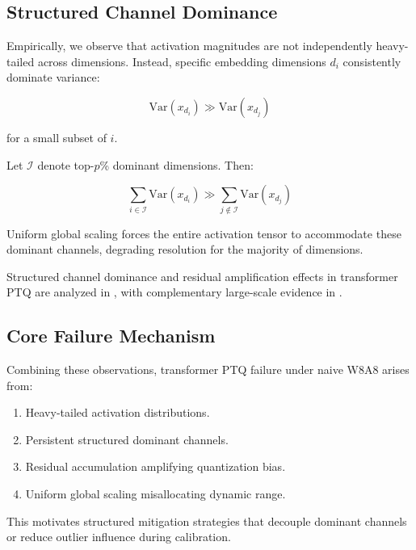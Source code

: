 \documentclass[conference]{IEEEtran}
\begin{document}
\subsection{Structured Channel Dominance}

Empirically, we observe that activation magnitudes are not independently heavy-tailed across dimensions. Instead, specific embedding dimensions $d_i$ consistently dominate variance:

\begin{equation}
\mathrm{Var}(x_{d_i}) \gg \mathrm{Var}(x_{d_j})
\end{equation}

for a small subset of $i$.

Let $\mathcal{I}$ denote top-$p$\% dominant dimensions. Then:

\begin{equation}
\sum_{i \in \mathcal{I}} \mathrm{Var}(x_{d_i}) \gg
\sum_{j \notin \mathcal{I}} \mathrm{Var}(x_{d_j})
\end{equation}

Uniform global scaling forces the entire activation tensor to accommodate these dominant channels, degrading resolution for the majority of dimensions.

Structured channel dominance and residual amplification effects in transformer PTQ are analyzed in \cite{bondarenko2021understanding}, with complementary large-scale evidence in \cite{dettmers2022llmint8}.

\subsection{Core Failure Mechanism}

Combining these observations, transformer PTQ failure under naive W8A8 arises from:

\begin{enumerate}
\item Heavy-tailed activation distributions.
\item Persistent structured dominant channels.
\item Residual accumulation amplifying quantization bias.
\item Uniform global scaling misallocating dynamic range.
\end{enumerate}

This motivates structured mitigation strategies that decouple dominant channels or reduce outlier influence during calibration.

\end{document}
